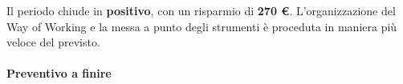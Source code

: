 Il periodo chiude in \textbf{positivo}, con un risparmio di \textbf{270 \euro}. L'organizzazione del Way of Working e la messa a punto degli strumenti è proceduta in maniera più veloce del previsto.


\paragraph{Preventivo a finire}
\subparagraph*{}

\pafTable{
	
}


